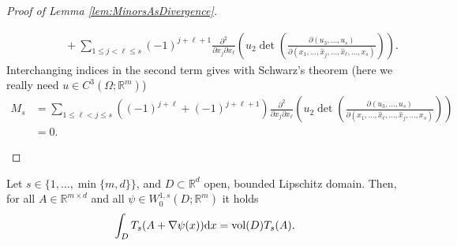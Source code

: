 \begin{proof}[Proof of Lemma \ref{lem:MinorsAsDivergence}]
\begin{itemize}
\begin{align*}
		&\qquad\qquad+\sum_{1\leq j<\ell\leq s}{(-1)^{j+\ell+1}\frac{\partial^2}{\partial x_j\partial x_\ell}\left(u_2\det\left(\frac{\partial(u_3,\dotsc,u_s)}{\partial(x_1,\dotsc,\widehat{x}_j,\dotsc,\widehat{x}_\ell,\dotsc,x_s)}\right)\right)}.
	\end{align*}
	Interchanging indices in the second term gives with Schwarz's theorem (here we really need $u\in C^3(\Omega;\mathbb{R}^m)$)
	\begin{align*}
		M_s&=\sum_{1\leq\ell<j\leq s}{\left((-1)^{j+\ell}+(-1)^{j+\ell+1}\right)\frac{\partial^2}{\partial x_j\partial x_\ell}\left(u_2\det\left(\frac{\partial(u_3,\dotsc,u_s)}{\partial(x_1,\dotsc,\widehat{x}_\ell,\dotsc,\widehat{x}_j,\dotsc,x_s)}\right)\right)}\\
		&=0.
	\end{align*}
\end{itemize}
\end{proof}

\begin{theorem}
Let $s\in\{1,\dotsc,\min\{m,d\}\}$, and $D\subset\mathbb{R}^d$ open, bounded Lipschitz domain. Then, for all $A\in\mathbb{R}^{m\times d}$ and all $\psi\in W_0^{1,s}(D;\mathbb{R}^m)$ it holds
\[\int_D{T_s(A+\nabla\psi(x))\mathrm{d}x}=\operatorname{vol}\mathopen{}\left(D\right)\mathclose{}T_s(A).\]
\end{theorem}

